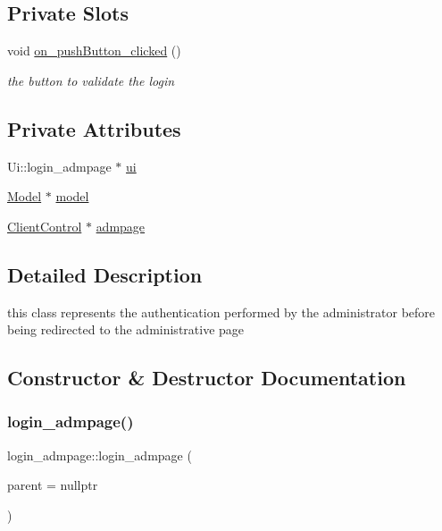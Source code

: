 \subsection*{Private Slots}
\begin{DoxyCompactItemize}
\item 
void \hyperlink{classlogin__admpage_a5c5d7211f6efd8808e4af7ac4b935b25}{on\+\_\+push\+Button\+\_\+clicked} ()
\begin{DoxyCompactList}\small\item\em the button to validate the login \end{DoxyCompactList}\end{DoxyCompactItemize}
\subsection*{Private Attributes}
\begin{DoxyCompactItemize}
\item 
Ui\+::login\+\_\+admpage $\ast$ \hyperlink{classlogin__admpage_a2cffa7dd24ff7c387d80bfc8bc8e2e55}{ui}
\item 
\hyperlink{classModel}{Model} $\ast$ \hyperlink{classlogin__admpage_a6bef6e4a441d314925df6759abf81fd4}{model}
\item 
\hyperlink{classClientControl}{Client\+Control} $\ast$ \hyperlink{classlogin__admpage_aff7598c838503fc7bd8cf0754199e278}{admpage}
\end{DoxyCompactItemize}


\subsection{Detailed Description}
this class represents the authentication performed by the administrator before being redirected to the administrative page 

\subsection{Constructor \& Destructor Documentation}
\mbox{\label{classlogin__admpage_a36c9365b61928fc1be6387e87be814ba}} 
\subsubsection{\texorpdfstring{login\+\_\+admpage()}{login\_admpage()}}
{\footnotesize\ttfamily login\+\_\+admpage\+::login\+\_\+admpage (\begin{DoxyParamCaption}\item[{Q\+Widget $\ast$}]{parent = {\ttfamily nullptr} }\end{DoxyParamCaption})\hspace{0.3cm}{\ttfamily [explicit]}}



